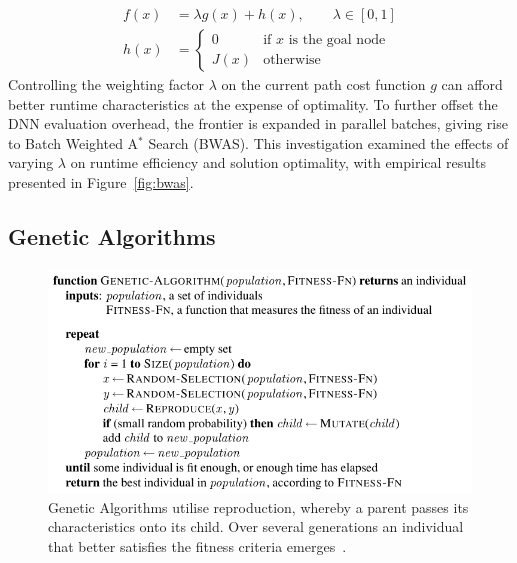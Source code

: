 \documentclass[UKenglish]{svproc}
\begin{document}
\begin{align*}
  f(x)&=\lambda g(x)+h(x),\qquad\lambda\in [0,1] \\
  h(x)&=
  \begin{cases}
    0    & \text{if $x$ is the goal node} \\
    J(x) & \text{otherwise}
  \end{cases}
\end{align*}
Controlling the weighting factor $\lambda$ on the current path cost function $g$ can afford better runtime characteristics at the expense of optimality. To further offset the DNN evaluation overhead, the frontier is expanded in parallel batches, giving rise to Batch Weighted A$^\ast$ Search (BWAS). This investigation examined the effects of varying $\lambda$ on runtime efficiency and solution optimality, with empirical results presented in Figure~\ref{fig:bwas}.

\subsection{Genetic Algorithms}

\begin{figure}[!ht]
  \centering
  \includegraphics[width=0.8\linewidth]{genetic-algorithm}
  \caption{Genetic Algorithms utilise reproduction, whereby a parent passes its
    characteristics onto its child. Over several generations an individual that
    better satisfies the fitness criteria emerges~\cite{10.5555/1671238}.}
  \label{fig:genetic-algorithm}
\end{figure}
\end{document}
